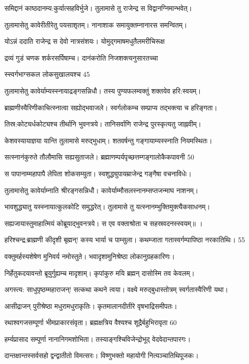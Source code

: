 समिद्दानं काष्ठदानम्य:कुर्यात्सहविर्भुजे।
तुलामासे तु राजेन्द्र स विद्वानग्निमान्भवेत्।

तुलामासेतु कावेरीतीरेतु पयसाशृतम्।
नानाशाक समायुक्तम्नानारस समन्वितम्।

योऽन्नं ददाति राजेन्द्र स देवो नात्रसंशयः।
योमुद्गमाषमधुतैलमरीचिरूक्ष

द्रव्यं गुडं चणक शर्करसर्पिषाम्च।
दानंकरोति निजशक्त्यनुसारतच्चा

स्स्वर्गभाग्सकल लोकसुखालयश्च 45

तुलामासेतु कावेर्याम्यस्स्नायाद्रङ्गसन्निधौ।
तस्य पुण्यफलम्वक्तुं शक्तयेव हरि:स्वयम्।

ब्राह्मणीस्वैरिणीकाचित्स्नात्वा सह्योद्भवाजले।
स्वर्गलोकम्च सम्प्राप्य तद्भक्त्या च हरिङ्गता।

तिस्र:कोट्यर्धकोट्यश्च तीर्थानि भुवनत्रये।
तानिसर्वाणि राजेन्द्र पुरस्कृत्यतु जाह्नवीम्।

केशवस्यायाज्ञया यान्ति तुलामासे मरुद्भुधाम्।
शतवर्षन्तु गङ्गायाम्यस्स्नाति नियमस्थितः।

सत्स्नानंकुरुते तौलौमासि सह्यसुताजले।
ब्रह्माणम्पर्यपृच्छत्तम्गङ्गालोकैकपावनी 50

स पापानाम्महापापै लेपिता शोकसम्युता।
स्वशुद्ध्युपायम्राजेन्द्र गङ्गैषा वचनाविधेः।

तुलामासेतु कावेर्याम्नाति श्रीरङ्गसन्निधौ।
कावेर्याम्मौसलस्नानम्सप्तजन्माघ नाशनम्।

भावशुद्ध्यातु यस्स्नायात्कुलकोटि समुद्धरेत्।
तुलामासे तु यत्स्नानम्भुक्तिमुक्त्यैकसाधनम्।

सह्यजायास्तुमाहात्मियं कोब्रूयाद्भुवनत्रये।
स एव वक्ताश्रोता च सहस्रवदनस्स्वयम्॥ ।

हरिश्चन्द्र:ब्राह्मणी कीदृशी बृह्मन्! कस्य भार्या च पाम्सुला।
कथम्जाता गतास्वर्गम्पापिष्ठा नरकातिथिः। 55

वक्तुमर्हस्यशेषेण मुनिवर्य नमोस्तुते।
भवादृशामुनिश्रेष्ठा लोकानुग्रहकारिणः।

निर्हेतुकदयावन्तो ब्रूयुर्गुह्यम्च मादृशाम्।
कृपांकुरु मयि ब्रह्मन् दासोस्मि तव केवलम्।

अगस्त्य:
साधुपृष्ठम्महाराजन्! सत्कथा कथने त्वया।
वक्ष्ये मरुद्बुधास्तोत्रम् स्वर्गतास्वैरिणी यथा।

आसीद्राजन् पुरीश्रेष्ठा मधुरामधुराकृतिः।
कृतमालानदीतीरे वृषभाद्रिसमीपतः।

रथाश्वगजसम्पूर्णा भीमप्राकारसंवृता।
ब्रह्मक्षत्रिय वैश्यश्च शूद्रैर्बहुभिरावृता 60

हर्म्यप्रासाद सम्पूर्णा नानानिगमशोभिता।
तस्याङ्गश्चिविजेन्द्रोभूद् वेदवेदान्तपारगः।

दान्तक्षान्तस्सर्वसहो द्वन्द्वातीतो विमत्सरः।
विष्णुभक्तो महायोगी नित्यञ्चातिथिपूजकः।

